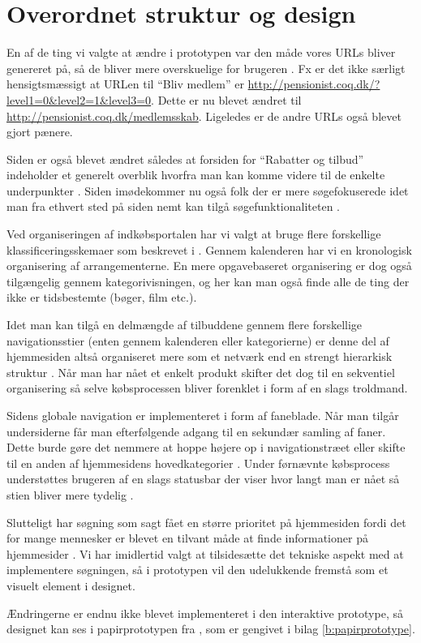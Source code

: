 \section{Overordnet struktur og design}

En af de ting vi valgte at ændre i prototypen var den
måde vores URLs bliver genereret på, så de bliver mere
overskuelige for brugeren \cite[s.~385]{Benyon2010}. Fx er det
ikke særligt hensigtsmæssigt at URLen til ``Bliv medlem'' er
\url{http://pensionist.coq.dk/?level1=0&level2=1&level3=0}. Dette er nu blevet
ændret til \url{http://pensionist.coq.dk/medlemsskab}. Ligeledes er de andre
URLs også blevet gjort pænere.

Siden er også blevet ændret således at forsiden for ``Rabatter og tilbud''
indeholder et generelt overblik hvorfra man kan komme videre til de enkelte
underpunkter \cite[s.~386]{Benyon2010}. Siden imødekommer nu også folk der
er mere søgefokuserede idet man fra ethvert sted på siden nemt kan tilgå
søgefunktionaliteten \cite[s. 386]{Benyon2010}.

Ved organiseringen af indkøbsportalen har vi valgt at bruge flere forskellige
klassificeringsskemaer som beskrevet i \cite[s.~392--394]{Benyon2010}.
Gennem kalenderen har vi en kronologisk organisering af arrangementerne.
En mere opgavebaseret organisering er dog også tilgængelig gennem
kategorivisningen, og her kan man også finde alle de ting der ikke er
tidsbestemte (bøger, film etc.).

Idet man kan tilgå en delmængde af tilbuddene gennem flere forskellige
navigationsstier (enten gennem kalenderen eller kategorierne) er denne del af
hjemmesiden altså organiseret mere som et netværk end en strengt hierarkisk
struktur \cite[s.~396]{Benyon2010}. Når man har nået et enkelt produkt
skifter det dog til en sekventiel organisering så selve købsprocessen bliver
forenklet i form af en slags troldmand.

Sidens globale navigation er implementeret i form af faneblade. Når
man tilgår undersiderne får man efterfølgende adgang til en sekundær
samling af faner. Dette burde gøre det nemmere at hoppe højere op i
navigationstræet eller skifte til en anden af hjemmesidens hovedkategorier
\cite[s.~402]{Benyon2010}. Under førnævnte købsprocess understøttes
brugeren af en slags statusbar der viser hvor langt man er nået så stien
bliver mere tydelig \cite[s.~403]{Benyon2010}.

Slutteligt har søgning som sagt fået en større prioritet på hjemmesiden
fordi det for mange mennesker er blevet en tilvant måde at finde
informationer på hjemmesider \cite[s.~405]{Benyon2010}. Vi har imidlertid
valgt at tilsidesætte det tekniske aspekt med at implementere søgningen, så
i prototypen vil den udelukkende fremstå som et visuelt element i designet.

Ændringerne er endnu ikke blevet implementeret i den interaktive prototype,
så designet kan ses i papirprototypen fra \cite{osos}, som er gengivet i
bilag \ref{b:papirprototype}.

